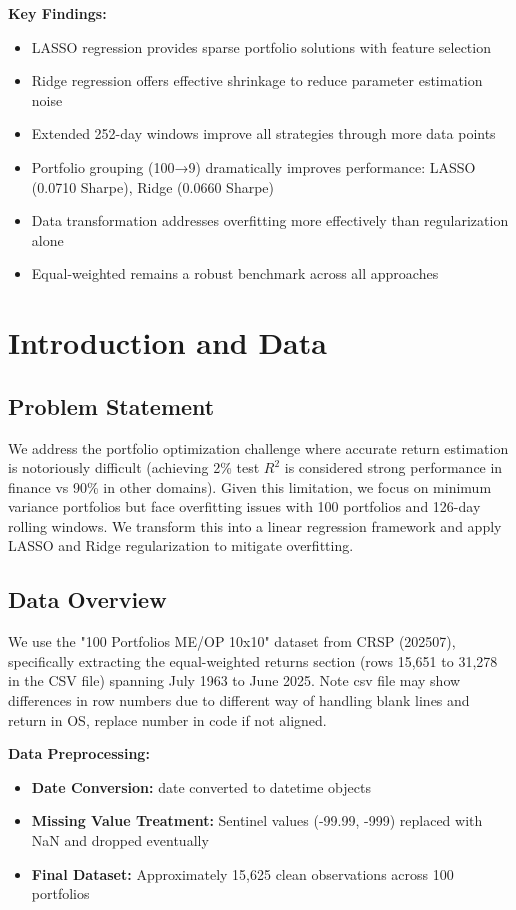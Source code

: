 \documentclass[12pt]{article}
\begin{document}
\textbf{Key Findings:}
\begin{itemize}
    \item LASSO regression provides sparse portfolio solutions with feature selection
    \item Ridge regression offers effective shrinkage to reduce parameter estimation noise
    \item Extended 252-day windows improve all strategies through more data points
    \item Portfolio grouping (100→9) dramatically improves performance: LASSO (0.0710 Sharpe), Ridge (0.0660 Sharpe)
    \item Data transformation addresses overfitting more effectively than regularization alone
    \item Equal-weighted remains a robust benchmark across all approaches
\end{itemize}

\section{Introduction and Data}

\subsection{Problem Statement}
We address the portfolio optimization challenge where accurate return estimation is notoriously difficult (achieving 2\% test $R^2$ is considered strong performance in finance vs 90\% in other domains). Given this limitation, we focus on minimum variance portfolios but face overfitting issues with 100 portfolios and 126-day rolling windows. We transform this into a linear regression framework and apply LASSO and Ridge regularization to mitigate overfitting.

\subsection{Data Overview}
We use the "100 Portfolios ME/OP 10x10" dataset from CRSP (202507), specifically extracting the equal-weighted returns section (rows 15,651 to 31,278 in the CSV file) spanning July 1963 to June 2025. Note csv file may show differences in row numbers due to different way of handling blank lines and return in OS, replace number in code if not aligned.

\textbf{Data Preprocessing:}
\begin{itemize}
    \item \textbf{Date Conversion:} date converted to datetime objects
    \item \textbf{Missing Value Treatment:} Sentinel values (-99.99, -999) replaced with NaN and dropped eventually
    \item \textbf{Final Dataset:} Approximately 15,625 clean observations across 100 portfolios
\end{itemize}
\end{document}
